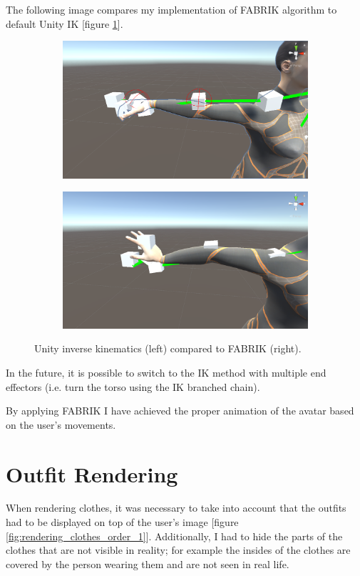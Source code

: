 \documentclass[a4paper]{report}
\begin{document}
The following image compares my implementation of FABRIK algorithm to default Unity IK [figure \ref{fig:IK_fabrik_vs_unity}].

 \begin{figure}[H]
\centering
\begin{subfigure}{\textwidth}
  \centering
  \includegraphics[width=.45\textwidth , keepaspectratio]{images/IK/unity_ik_hand.png}
\end{subfigure}%
\begin{subfigure}{\textwidth}
  \centering
 \includegraphics[width=.45\textwidth , keepaspectratio]{images/IK/diy_ik_hand.png}
\end{subfigure}
\caption{Unity inverse kinematics (left) compared to FABRIK (right).}
\label{fig:IK_fabrik_vs_unity}
\end{figure}
	

\bigskip In the future, it is possible to switch to the IK method with multiple end effectors (i.e. turn the torso using the IK branched chain)\cite{upbodyIK}.


\bigspace By applying FABRIK I have achieved the proper animation of the avatar based on the user's movements.


\section{Outfit Rendering}

\qquad When rendering clothes, it was necessary to take into account that the outfits had to be displayed on top of the user's image [figure \ref{fig:rendering_clothes_order_1}]. Additionally, I had to hide the parts of the clothes that are not visible in reality; for example the insides of the clothes are covered by the person wearing them and are not seen in real life. 
\end{document}
